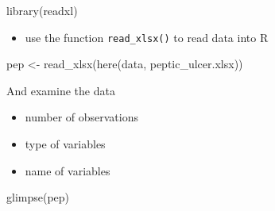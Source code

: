\documentclass[
  10pt,
]{krantz}
\newenvironment{Shaded}{\begin{snugshade}}{\end{snugshade}}
\newcommand{\FunctionTok}[1]{\textcolor[rgb]{0.00,0.00,0.00}{#1}}
\newcommand{\NormalTok}[1]{#1}
\newcommand{\OtherTok}[1]{\textcolor[rgb]{0.56,0.35,0.01}{#1}}
\newcommand{\StringTok}[1]{\textcolor[rgb]{0.31,0.60,0.02}{#1}}
\providecommand{\tightlist}{%
  \setlength{\itemsep}{0pt}\setlength{\parskip}{0pt}}
\begin{document}
\begin{Shaded}
\begin{Highlighting}[]
\FunctionTok{library}\NormalTok{(readxl)}
\end{Highlighting}
\end{Shaded}

\begin{itemize}
\tightlist
\item
  use the function \texttt{read\_xlsx()} to read data into R
\end{itemize}

\begin{Shaded}
\begin{Highlighting}[]
\NormalTok{pep }\OtherTok{\textless{}{-}} \FunctionTok{read\_xlsx}\NormalTok{(}\FunctionTok{here}\NormalTok{(}\StringTok{\textquotesingle{}data\textquotesingle{}}\NormalTok{, }\StringTok{\textquotesingle{}peptic\_ulcer.xlsx\textquotesingle{}}\NormalTok{))}
\end{Highlighting}
\end{Shaded}

And examine the data

\begin{itemize}
\tightlist
\item
  number of observations
\item
  type of variables
\item
  name of variables
\end{itemize}

\begin{Shaded}
\begin{Highlighting}[]
\FunctionTok{glimpse}\NormalTok{(pep)}
\end{Highlighting}
\end{Shaded}
\end{document}
